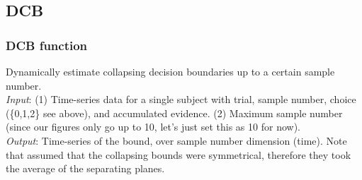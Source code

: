 \documentclass[
]{book}
\begin{document}
\hypertarget{dcb-1}{%
\subsection{DCB}\label{dcb-1}}

\hypertarget{dcb-function}{%
\subsubsection*{DCB function}\label{dcb-function}}

Dynamically estimate collapsing decision boundaries up to a certain sample number.\\
\emph{Input}: (1) Time-series data for a single subject with trial, sample number, choice (\{0,1,2\} see above), and accumulated evidence. (2) Maximum sample number (since our figures only go up to 10, let's just set this as 10 for now).\\
\emph{Output}: Time-series of the bound, over sample number dimension (time). Note that \citep{glickman2022} assumed that the collapsing bounds were symmetrical, therefore they took the average of the separating planes.
\end{document}
